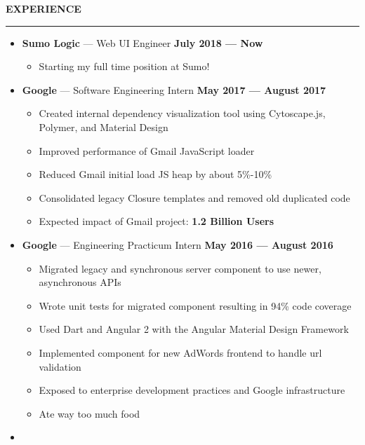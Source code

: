 \documentclass[10pt, oneside]{letter}
\newcommand{\linespaceshit} {
  \vspace{0.05in}
  \hrule
  \vspace{0.05in}
}
\newcommand{\textapprox}{\raisebox{0.5ex}{\texttildelow}}
\begin{document}
  \textbf{EXPERIENCE}
  \linespaceshit
    \begin{adjustwidth}{0.1in}{0pt}

      \begin{itemize}
        \item
          \textbf{Sumo Logic} --- Web UI Engineer \hfill  \textbf{July 2018 --- Now}
            \begin{itemize}
              \item{Starting my full time position at Sumo!}
            \end{itemize}
        \item
          \textbf{Google} --- Software Engineering Intern \hfill  \textbf{May 2017 --- August 2017}
            \begin{itemize}
              \item Created internal dependency visualization tool using Cytoscape.js, Polymer, and Material Design
              \item Improved performance of Gmail JavaScript loader
              \item Reduced Gmail initial load JS heap by about 5\%-10\%
              \item Consolidated legacy Closure templates and removed old duplicated code
              \item Expected impact of Gmail project: \textbf{\textapprox 1.2 Billion Users}
            \end{itemize}
        \item
          \textbf{Google} --- Engineering Practicum Intern \hfill  \textbf{May 2016 --- August 2016}
            \begin{itemize}
              \item Migrated legacy and synchronous server component to use newer, asynchronous APIs
              \item Wrote unit tests for migrated component resulting in 94\% code coverage
              \item Used Dart and Angular 2 with the Angular Material Design Framework
              \item Implemented component for new AdWords frontend to handle url validation
              \item Exposed to enterprise development practices and Google infrastructure
              \item Ate way too much food
            \end{itemize}
        \item

\end{itemize}
\end{adjustwidth}
\end{document}
